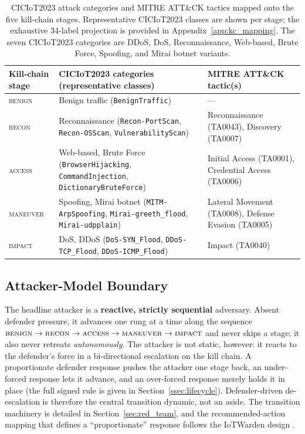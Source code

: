 \begin{table}[!htbp]
\centering
\caption[Attack-category and MITRE ATT\&CK mapping per kill-chain stage.]{CICIoT2023 attack categories and MITRE ATT\&CK tactics mapped onto the five kill-chain stages. Representative CICIoT2023 classes are shown per stage; the exhaustive 34-label projection is provided in Appendix~\ref{app:kc_mapping}. The seven CICIoT2023 categories are DDoS, DoS, Reconnaissance, Web-based, Brute Force, Spoofing, and Mirai botnet variants.}
\label{tab:attack_mapping}
\small
\begin{tabularx}{\textwidth}{l >{\raggedright\arraybackslash}X >{\raggedright\arraybackslash}X}
\toprule
\textbf{Kill-chain stage} & \textbf{CICIoT2023 categories (representative classes)} & \textbf{MITRE ATT\&CK tactic(s)} \\
\midrule
\textsc{benign}   & Benign traffic (\texttt{BenignTraffic}) & --- \\
\addlinespace
\textsc{recon}    & Reconnaissance (\texttt{Recon-PortScan}, \texttt{Recon-OSScan}, \texttt{VulnerabilityScan}) & Reconnaissance (TA0043), Discovery (TA0007) \\
\addlinespace
\textsc{access}   & Web-based, Brute Force (\texttt{BrowserHijacking}, \texttt{CommandInjection}, \texttt{DictionaryBruteForce}) & Initial Access (TA0001), Credential Access (TA0006) \\
\addlinespace
\textsc{maneuver} & Spoofing, Mirai botnet (\texttt{MITM-ArpSpoofing}, \texttt{Mirai-greeth\_flood}, \texttt{Mirai-udpplain}) & Lateral Movement (TA0008), Defense Evasion (TA0005) \\
\addlinespace
\textsc{impact}   & DoS, DDoS (\texttt{DoS-SYN\_Flood}, \texttt{DDoS-TCP\_Flood}, \texttt{DDoS-ICMP\_Flood}) & Impact (TA0040) \\
\bottomrule
\end{tabularx}
\end{table}

\subsection{Attacker-Model Boundary}
\label{ssec:monotonic_attacker}
The headline attacker is a \textbf{reactive, strictly sequential} adversary. Absent defender pressure, it advances one rung at a time along the sequence $\textsc{benign} \to \textsc{recon} \to \textsc{access} \to \textsc{maneuver} \to \textsc{impact}$ and never skips a stage; it also never retreats \emph{autonomously}. The attacker is not static, however: it reacts to the defender's force in a bi-directional escalation on the kill chain. A proportionate defender response pushes the attacker one stage back, an under-forced response lets it advance, and an over-forced response merely holds it in place (the full signed rule is given in Section~\ref{ssec:lifecycle}). Defender-driven de-escalation is therefore the central transition dynamic, not an aside. The transition machinery is detailed in Section~\ref{sec:red_team}, and the recommended-action mapping that defines a ``proportionate'' response follows the IoTWarden design \cite{Alam2024}.

